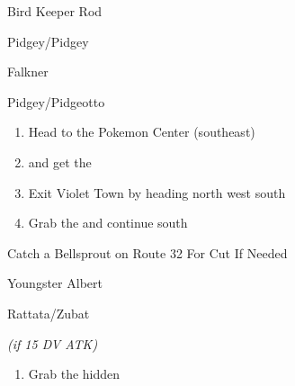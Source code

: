 \begin{paracol}{2}
\switchcolumn
\begin{trainer}{Bird Keeper Rod}
	\varwb
	\begin{fightSection}{Pidgey/Pidgey}
		\item {} \rage{}
	\end{fightSection}
	\varwe
\end{trainer}

\begin{boss}{Falkner}
	\varwb
	\begin{fightSection}{Pidgey/Pidgeotto}
		\item {} \rage{}
	\end{fightSection}
	\varwe
\end{boss}

\begin{enumerate}[resume]
	\item Head to the Pokemon Center (southeast)
	\item {} and get the 
	\item Exit Violet Town by heading north \pointRight{} west \pointRight{} south
	\item Grab the  and continue south
\end{enumerate}

\switchcolumn
\begin{encounter}{Catch a Bellsprout on Route 32 For Cut If Needed}
	\varwb
	\begin{notes}
		\item {} \scratch
		\item \pokeBall{} \encounterHlTwo{(\pointRight)}
	\end{notes}
	\varwe
\end{encounter}

\switchcolumn
\begin{trainer}{Youngster Albert}
	\varwb
	\begin{fightSection}{Rattata/Zubat}
		\item {} \scratch
		\begin{notes}
			\small{\item {} \rage{} \textit{(if 15 DV ATK)}}
		\end{notes}
	\end{fightSection}
	\varwe
\end{trainer}

\begin{enumerate}[resume]
	\item Grab the hidden 
\end{enumerate}


\end{paracol}
